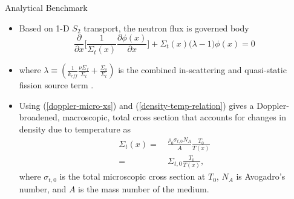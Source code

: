 \documentclass[9pt,t]{beamer}
\begin{document}
\begin{frame}{Analytical Benchmark}
    \begin{itemize}
        \item Based on 1-D $S_{2}$ transport, the neutron flux is governed body
        \begin{equation}
            \frac{\partial}{\partial x}\bigg[\frac{1}{\Sigma_{t}(x)} \frac{\partial\phi(x)}{\partial x} \bigg] + \Sigma_{t}(x)
            \big(\lambda - 1\big)\phi(x) = 0
        \end{equation}
        \item where $\lambda \equiv (\frac{1}{k_{eff}}\frac{\nu \Sigma_{f}}{\Sigma_{t}} + \frac{\Sigma_{s}}{\Sigma_{t}} )$ is
        the combined in-scattering and quasi-static fission source term \cite{analytical-benchmark}.
        \item Using (\ref{doppler-micro-xs}) and (\ref{density-temp-relation}) gives a Doppler-broadened, macroscopic, total
              cross section that accounts for changes in density due to temperature as
        \begin{equation}\begin{aligned}
            \Sigma_{t}(x) =&\  \frac{\rho_{0}\sigma_{t,0} N_{A}}{A} \frac{T_{0}}{T(x)}\\
            =&\  \Sigma_{t,0}\frac{T_{0}}{T(x)} ,
        \end{aligned}\end{equation}
        where $ \sigma_{t,0}$ is the total microscopic cross section at $T_{0}$, $N_{A}$ is Avogadro's number, and $A$ is the mass number
        of the medium.
    \end{itemize}
\end{frame}
\end{document}
